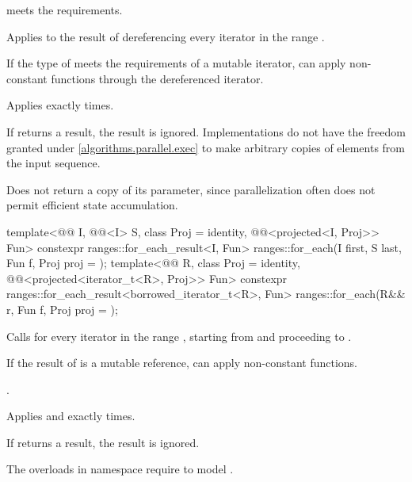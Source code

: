 \begin{itemdescr}
\pnum
\expects
{} meets the  requirements.

\pnum
\effects
Applies  to the result of dereferencing
every iterator in the range .
\begin{note}
If the type of  meets the requirements of a mutable iterator,
 can apply non-constant functions through the dereferenced iterator.
\end{note}

\pnum
\complexity
Applies  exactly  times.

\pnum
\remarks
If  returns a result, the result is ignored.
Implementations do not have
the freedom granted under \ref{algorithms.parallel.exec}
to make arbitrary copies of elements from the input sequence.

\pnum
\begin{note}
Does not return a copy of its  parameter,
since parallelization often does not permit efficient state accumulation.
\end{note}
\end{itemdescr}

%
\begin{itemdecl}
template<@@ I, @@<I> S, class Proj = identity,
         @@<projected<I, Proj>> Fun>
  constexpr ranges::for_each_result<I, Fun>
    ranges::for_each(I first, S last, Fun f, Proj proj = {});
template<@@ R, class Proj = identity,
         @@<projected<iterator_t<R>, Proj>> Fun>
  constexpr ranges::for_each_result<borrowed_iterator_t<R>, Fun>
    ranges::for_each(R&& r, Fun f, Proj proj = {});
\end{itemdecl}

\begin{itemdescr}
\pnum
\effects
Calls 
for every iterator  in the range ,
starting from  and proceeding to .
\begin{note}
If the result of  is a mutable reference,
 can apply non-constant functions.
\end{note}

\pnum
\returns
{}.

\pnum
\complexity
Applies  and  exactly  times.

\pnum
\remarks
If  returns a result, the result is ignored.

\pnum
\begin{note}
The overloads in namespace  require
 to model .
\end{note}
\end{itemdescr}

